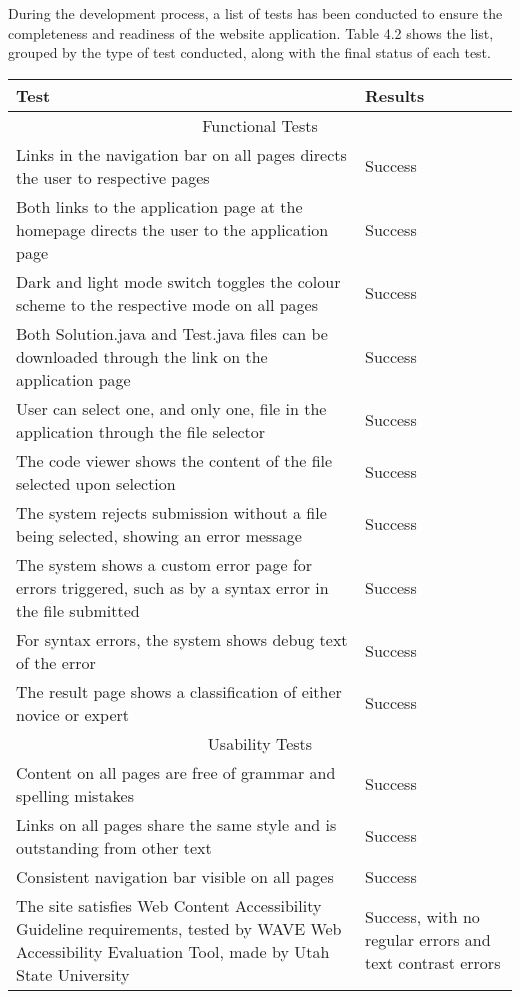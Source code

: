 \documentclass{report}
\begin{document}
During the development process, a list of tests has been conducted to ensure the completeness and readiness of the website application. Table 4.2 shows the list, grouped by the type of test conducted, along with the final status of each test.

\begin{longtable}[h!]{m{23em}|m{13em}}
\hline
Test & Results \\
\endhead
\hline
\multicolumn{2}{c}{Functional Tests} \\
\hline
Links in the navigation bar on all pages directs the user to respective pages & Success \\
\hline
Both links to the application page at the homepage directs the user to the application page & Success \\
\hline
Dark and light mode switch toggles the colour scheme to the respective mode on all pages & Success \\
\hline
Both Solution.java and Test.java files can be downloaded through the link on the application page & Success \\
\hline
User can select one, and only one, file in the application through the file selector & Success \\
\hline
The code viewer shows the content of the file selected upon selection & Success \\
\hline
The system rejects submission without a file being selected, showing an error message & Success \\
\hline
The system shows a custom error page for errors triggered, such as by a syntax error in the file submitted & Success \\
\hline
For syntax errors, the system shows debug text of the error & Success \\
\hline
The result page shows a classification of either novice or expert & Success \\
\hline
\multicolumn{2}{c}{Usability Tests} \\
\hline
Content on all pages are free of grammar and spelling mistakes & Success \\
\hline
Links on all pages share the same style and is outstanding from other text & Success \\
\hline
Consistent navigation bar visible on all pages & Success \\
\hline
The site satisfies Web Content Accessibility Guideline requirements, tested by WAVE Web Accessibility Evaluation Tool, made by Utah State University & Success, with no regular errors and text contrast errors \\

\end{longtable}
\end{document}
